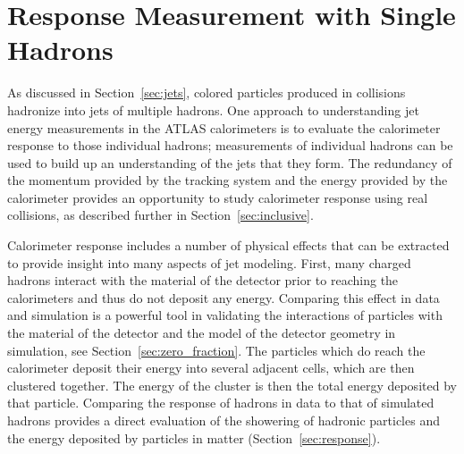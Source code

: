 \chapter{Response Measurement with Single Hadrons}

\newcommand*{\pL}{\ensuremath{\Lambda}\xspace}
\newcommand*{\pLB}{\ensuremath{\bar{\Lambda}}\xspace}
\newcommand*{\pKS}{\ensuremath{K_\text{S}^{0}}\xspace}
\newcommand*{\pKL}{\ensuremath{K_L}\xspace}
\newcommand*{\pP}{\ensuremath{p}\xspace}
\newcommand*{\pAP}{\ensuremath{\bar{p}}\xspace}
\newcommand*{\pip}{\ensuremath{\pi^+}\xspace}
\newcommand*{\pim}{\ensuremath{\pi^-}\xspace}
\newcommand*{\piz}{\ensuremath{\pi^0}\xspace}
\newcommand*{\ep}{\ensuremath{E/p}\xspace}
\newcommand*{\epav}{\ensuremath{\langle E/p \rangle}\xspace}
\newcommand*{\epcor}{\ensuremath{\langle E/p \rangle_{\mathrm{COR}}}\xspace}
\newcommand*{\epbg}{\ensuremath{\langle E/p \rangle_{\mathrm{BG}}}\xspace}
\newcommand*{\Ea}{\ensuremath{E_a}\xspace}
\newcommand*{\QGSP}{\texttt{QGSP\_BERT}\xspace}
\newcommand*{\FTFP}{\texttt{FTFP\_BERT}\xspace}


\label{ch:singlehadrons}

As discussed in Section~\ref{sec:jets}, colored particles produced in collisions hadronize into jets of multiple hadrons.
One approach to understanding jet energy measurements in the ATLAS calorimeters is to evaluate the calorimeter response to those individual hadrons; measurements of individual hadrons can be used to build up an understanding of the jets that they form.
The redundancy of the momentum provided by the tracking system and the energy provided by the calorimeter provides an opportunity to study calorimeter response using real collisions, as described further in Section~\ref{sec:inclusive}.

Calorimeter response includes a number of physical effects that can be extracted to provide insight into many aspects of jet modeling.
First, many charged hadrons interact with the material of the detector prior to reaching the calorimeters and thus do not deposit any energy.
Comparing this effect in data and simulation is a powerful tool in validating the interactions of particles with the material of the detector and the model of the detector geometry in simulation, see Section~\ref{sec:zero_fraction}.
The particles which do reach the calorimeter deposit their energy into several adjacent cells, which are then clustered together.
The energy of the cluster is then the total energy deposited by that particle.
Comparing the response of hadrons in data to that of simulated hadrons provides a direct evaluation of the showering of hadronic particles and the energy deposited by particles in matter (Section~\ref{sec:response}). 

